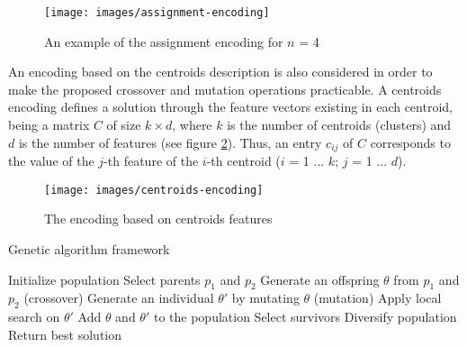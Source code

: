 \begin{figure}[h]
  \begin{center}
    \texttt{[image: images/assignment-encoding]}
    \caption{An example of the assignment encoding for $n$ = 4}\label{fig:assignment-encoding}
  \end{center}
\end{figure}

An encoding based on the centroids description is also considered in order to make the proposed crossover and mutation operations practicable. A centroids encoding defines a solution through the feature vectors existing in each centroid, being a matrix $C$ of size $k \times d$, where $k$ is the number of centroids (clusters) and $d$ is the number of features (see figure \ref{fig:centroids-encoding}). Thus, an entry $c_{ij}$ of $C$ corresponds to the value of the $j$-th feature of the $i$-th centroid ($i$ = 1 ... $k$; $j$ = 1 ... $d$).


\begin{figure}[h]
  \begin{center}
    \texttt{[image: images/centroids-encoding]}
    \caption{The encoding based on centroids features}\label{fig:centroids-encoding}
  \end{center}
\end{figure}


\begin{algorithm}[H]
\caption{Genetic algorithm framework}
\label{genetic-algo}
\begin{algorithmic}[1]
\STATE Initialize population
\STATE Select parents $p_1$ and $p_2$
\STATE Generate an offspring $\theta$ from $p_1$ and $p_2$ (crossover)
\STATE Generate an individual $\theta'$ by mutating $\theta$ (mutation)
\STATE Apply local search on $\theta'$
\STATE Add $\theta$ and $\theta'$ to the population
\STATE Select survivors
\STATE Diversify population
\ENDIF
\ENDIF
\ENDWHILE
\STATE Return best solution
\end{algorithmic}
\end{algorithm}


